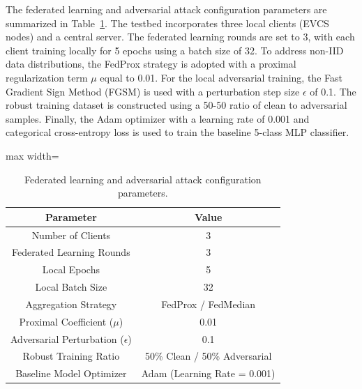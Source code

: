 \documentclass[10pt, a4paper, conference]{IEEEtran}
\begin{document}
The federated learning and adversarial attack configuration parameters are summarized in Table~\ref{tab:configuration_parameters}. 
The testbed incorporates three local clients (EVCS nodes) and a central server. The federated learning rounds are set to 3, with each client training locally for 5 epochs using a batch size of 32. To address non-IID data distributions, the FedProx strategy is adopted with a proximal regularization term $\mu$ equal to 0.01. For the local adversarial training, the Fast Gradient Sign Method (FGSM) is used with a perturbation step size $\epsilon$ of 0.1. The robust training dataset is constructed using a 50-50 ratio of clean to adversarial samples. Finally, the Adam optimizer with a learning rate of 0.001 and categorical cross-entropy loss is used to train the baseline 5-class MLP classifier.

\begin{table}[htbp]
\renewcommand{\arraystretch}{1.2}
\centering
\caption{Federated learning and adversarial attack configuration parameters.}
\label{tab:configuration_parameters}
\begin{adjustbox}{max width=\columnwidth}
\begin{tabular}{cc}
\hline
\textbf{Parameter} & \textbf{Value} \\ \hline
Number of Clients & 3 \\
Federated Learning Rounds & 3 \\
Local Epochs & 5 \\
Local Batch Size & 32 \\
Aggregation Strategy & FedProx / FedMedian \\
Proximal Coefficient ($\mu$) & 0.01 \\
Adversarial Perturbation ($\epsilon$) & 0.1 \\
Robust Training Ratio & 50\% Clean / 50\% Adversarial \\
Baseline Model Optimizer & Adam (Learning Rate = 0.001) \\ \hline
\end{tabular}
\end{adjustbox}
\end{table} 
\end{document}
